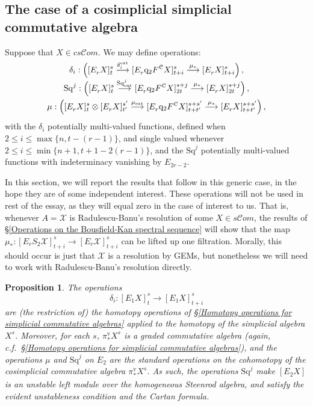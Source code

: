 \documentclass[11pt]{amsart} \renewcommand{\baselinestretch}{1.4}
\theoremstyle{plain}
\newtheorem{prop}[thm]{Proposition}
\theoremstyle{definition}
\renewcommand{\to}{\longrightarrow}
\newcommand{\scrC}{\mathscr{C}}
\newcommand{\calx}{\mathcal{X}}
\newcommand{\calc}{\mathcal{C}}
\newcommand{\quadgrad}[1]{\mathrm{q}_{#1}}
\newcommand{\Sq}{\mathrm{Sq}}
\newcommand{\algs}{{\scrC\!\textit{om}}}
\newcommand{\Edownup}[5]{[E_{#1}^{#2}#3]^{#4}_{#5}}
\newcommand{\uver}{^\mathrm{v}}
\begin{document}
\begin{second quadrant homotopy sseq operations}
\subsection{The case of a cosimplicial simplicial commutative algebra}
\label{The case of a cosimplicial simplicial commutative algebra}
Suppose that $X\in cs\algs$. We may define operations:
\begin{gather*}
\delta_i:\left(\Edownup{r}{}{X}{s}{t} \smash{{}\overset{\delta_i^\textup{ext}}{\to}{}} \Edownup{r}{}{\quadgrad{2}F^\calc X}{s}{t+i}\overset{\mu_*}{\to} 
\Edownup{r}{}{X}{s}{t+i}\right),
\\
\Sq^j:\left(\Edownup{r}{}{X}{s}{t}   \smash{{}\overset{\Sq^j_\textup{ext}}{\to}{}} \Edownup{r}{}{\quadgrad{2}F^\calc X}{s+j}{2t}\overset{\mu_*}{\to} 
\Edownup{r}{}{X}{s+j}{2t}\right),\\
\mu:\left(\Edownup{r}{}{X}{s}{t}\otimes \Edownup{r}{}{X}{s'}{t'}\smash{{}\overset{\mu_\textup{ext}}{\to}{}} \Edownup{r}{}{\quadgrad{2}F^\calc X}{s+s'}{t+t'}\overset{\mu_*}{\to} 
\Edownup{r}{}{X}{s+s'}{t+t'}\right),
\end{gather*}
with the $\delta_i$ potentially multi-valued functions,  defined when $2\leq i\leq \max\{n,t-(r-1)\}$, and single valued whenever $2\leq i\leq\min\{n+1,t+1-2(r-1)\}$, and the $\Sq^j$ potentially multi-valued functions with indeterminacy vanishing by $E_{2r-2}$. 

In this section, we will report the results that follow in this generic case, in the hope they are of some independent interest. These operations will not be used in rest of the essay, as they will equal zero in the case of interest to us. That is, whenever $A=\calx$ is Radulescu-Banu's resolution of some $X\in s\algs$, the results of \S\ref{Operations on the Bousfield-Kan spectral sequence} will show that  the map $\mu_*:\Edownup{r}{}{S_2\calx}{s}{t+i}\to \Edownup{r}{}{\calx}{s}{t+i}$ can be lifted up one filtration. Morally, this should occur is just that $\calx$ is a resolution by GEMs, but nonetheless we will need to work with  Radulescu-Banu's resolution directly.


\begin{prop}
\label{final generic prop for basic sseq ops}
The operations 
\[\delta_i:\Edownup{1}{}{X}{s}{t}\to \Edownup{1}{}{X}{s}{t+i}\]
are (the restriction of) the homotopy operations of \S\ref{Homotopy operations for simplicial commutative algebras} applied to the homotopy of the simplicial algebra $X^{s}$. Moreover, for each $s$, $\pi\uver_*X^s$ is a graded commutative algebra (again, c.f.\ \S\ref{Homotopy operations for simplicial commutative algebras}), and the operations $\mu$ and $\Sq^j$ on $E_2$ are the standard operations on the cohomotopy of the cosimplicial commutative algebra $\pi\uver_*X^s$. As such, the operations $\Sq^j$ make $\Edownup{2}{}{X}{}{}$ is an unstable left module over the homogeneous Steenrod algebra, and satisfy the evident unstableness condition and the Cartan formula.


\end{prop}
\end{second quadrant homotopy sseq operations}
\end{document}
